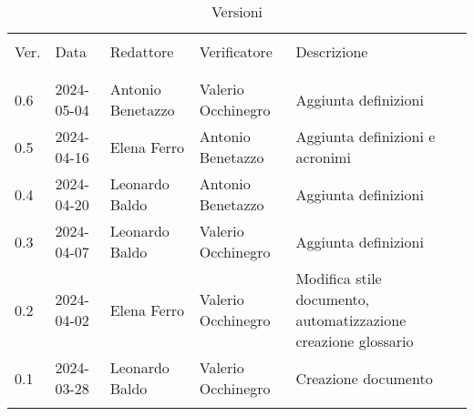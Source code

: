 \documentclass[italian,12pt]{article}
\begin{document}


\newpage



\begin{table}[!h]
	\caption{Versioni}
	\footnotesize
	\begin{center}
		\begin{tabular}{ l l l l p{6cm} }
			\hline                                                                                                                      \\[-2ex]
			Ver. & Data       & Redattore         & Verificatore       & Descrizione                                                    \\
			\\[-2ex] \hline \\[-1.5ex]
			0.6  & 2024-05-04 & Antonio Benetazzo & Valerio Occhinegro & Aggiunta definizioni                                           \\
			0.5  & 2024-04-16 & Elena Ferro       & Antonio Benetazzo  & Aggiunta definizioni e acronimi                                \\
			0.4  & 2024-04-20 & Leonardo Baldo    & Antonio Benetazzo  & Aggiunta definizioni                                           \\
			0.3  & 2024-04-07 & Leonardo Baldo    & Valerio Occhinegro & Aggiunta definizioni                                           \\
			0.2  & 2024-04-02 & Elena Ferro       & Valerio Occhinegro & Modifica stile documento, automatizzazione creazione glossario \\
			0.1  & 2024-03-28 & Leonardo Baldo    & Valerio Occhinegro & Creazione documento                                            \\
			\\[-1.5ex] \hline
		\end{tabular}
	\end{center}
\end{table}

\newpage
\tableofcontents
\printglossary[style=myaltlistgroup,title=]
\end{document}
